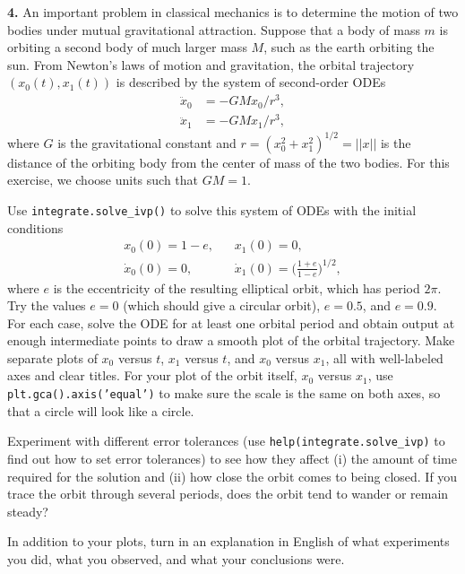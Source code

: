 \documentclass[11pt]{article}
\begin{document}
\newpage
{\bf 4.} 
An important problem in classical mechanics is to determine the motion
of two bodies under mutual gravitational attraction.
Suppose that a body of mass $m$ is orbiting a second body of much larger mass $M$,
such as the earth orbiting the sun.
From Newton's laws of motion and gravitation,
the orbital trajectory $(x_0(t), x_1(t))$ is described by the system
of second-order ODEs
\begin{align}
\ddot x_0 &= -GMx_0/r^3, \\
\ddot x_1 &= -GMx_1/r^3, 
\end{align}
where $G$ is the gravitational constant and $r = (x_0^2 + x_1^2)^{1/2} = ||x||$
is the distance of the orbiting body from the center of mass of the two bodies.
For this exercise, we choose units such that $GM=1$.

\par\medskip
Use {\tt integrate.solve\_ivp()} to solve this system of ODEs with the initial conditions
\begin{align}
x_0(0)      = 1-e, & \;\;\; x_1(0)      = 0, \\
\dot x_0(0) = 0,   & \;\;\; \dot x_1(0) = \Big(\frac{1+e}{1-e}\Big)^{1/2},
\end{align}
where $e$ is the eccentricity of the resulting elliptical orbit,
which has period $2\pi$.
Try the values $e=0$ (which should give a circular orbit),
$e=0.5$, and $e=0.9$.
For each case, solve the ODE for at least one orbital period and obtain output 
at enough intermediate points to draw a smooth plot of the orbital trajectory.
Make separate plots of $x_0$ versus $t$, $x_1$ versus $t$, and $x_0$ versus $x_1$,
all with well-labeled axes and clear titles.
For your plot of the orbit itself, $x_0$ versus  $x_1$, 
use {\tt plt.gca().axis('equal')} to make sure the scale is the same on both axes,
so that a circle will look like a circle.

Experiment with different error tolerances 
(use {\tt help(integrate.solve\_ivp)} to find out how to set error tolerances)
to see how they affect 
(i)  the amount of time required for the solution and 
(ii) how close the orbit comes to being closed.
If you trace the orbit through several periods, 
does the orbit tend to wander or remain steady?
\par
In addition to your plots, 
turn in an explanation in English of what experiments you did,
what you observed, and what your conclusions were.
\end{document}
